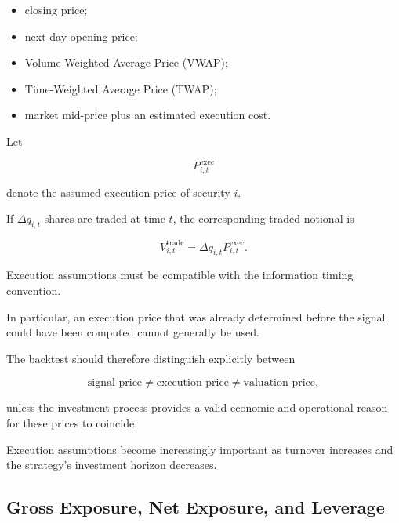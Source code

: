 \documentclass[11pt,a4paper]{article}
\begin{document}
\begin{itemize}
    \item closing price;

    \item next-day opening price;

    \item Volume-Weighted Average Price (VWAP);

    \item Time-Weighted Average Price (TWAP);

    \item market mid-price plus an estimated execution cost.
\end{itemize}

Let

\begin{equation}
P_{i,t}^{\mathrm{exec}}
\end{equation}

denote the assumed execution price of security $i$.

If $\Delta q_{i,t}$ shares are traded at time $t$, the corresponding traded
notional is

\begin{equation}
V_{i,t}^{\mathrm{trade}}
=
\Delta q_{i,t}
P_{i,t}^{\mathrm{exec}}.
\end{equation}

Execution assumptions must be compatible with the information timing
convention.

In particular, an execution price that was already determined before the
signal could have been computed cannot generally be used.

The backtest should therefore distinguish explicitly between

\begin{equation}
\boxed{
\text{signal price}
\neq
\text{execution price}
\neq
\text{valuation price},
}
\end{equation}

unless the investment process provides a valid economic and operational reason
for these prices to coincide.

Execution assumptions become increasingly important as turnover increases and
the strategy's investment horizon decreases.


\subsection{Gross Exposure, Net Exposure, and Leverage}
\label{subsec:gross_net_leverage}
\end{document}
